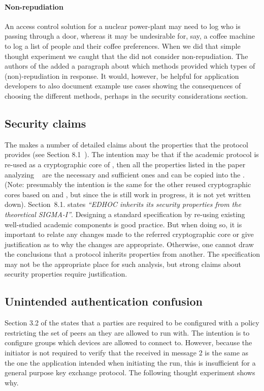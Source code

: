 \documentclass[runningheads,draft,x11names]{llncs}
\begin{document}
\paragraph{Non-repudiation}
An access control solution for a nuclear power-plant may need to log who is
passing through a door, whereas it may be undesirable for, say, a coffee machine
to log a list of people and their coffee preferences.
%
When we did that simple thought experiment we caught that the \mSpec{} did not
consider non-repudiation.
%
The authors of the \mSpec{} added a paragraph about which methods provided which
types of (non)-repudiation in response.
%
It would, however, be helpful for application developers to also document
example use cases showing the consequences of choosing the different methods,
perhaps in the security considerations section.

\subsection{Security claims}
\label{sec:securityClaims}
The \mSpec{} makes a number of detailed claims about the properties that
the protocol provides (see Section 8.1~\cite{selander-lake-edhoc-01}).
%
The intention may be that if the academic protocol \mSigma{} is re-used as a
cryptographic core of \mEdhoc, then all the properties listed
in the paper analyzing \mSigma~\cite{DBLP:conf/crypto/CanettiK02} are the
necessary and sufficient ones and can be copied into the \mSpec.
%
(Note: presumably the intention is the same for the other reused cryptographic
cores based on \mOptls{} and \mNoise{}, but since the \mSpec{} is still work in
progress, it is not yet written down).
%
Section~8.1. states \emph{``EDHOC inherits its security properties
from the theoretical SIGMA-I''}.
%
Designing a standard specification by re-using existing well-studied academic
components is good practice.
%
But when doing so, it is important to relate any changes made to the referred
cryptographic core or give justification as to why the changes are appropriate.
%
Otherwise, one cannot draw the conclusions that a protocol inherits properties
from another.
%
The specification may not be the appropriate place for such analysis, but strong
claims about security properties require justification.
%

\subsection{Unintended authentication confusion}
\label{sec:usableSecurity}
Section 3.2 of the \mSpec{} states that a parties are required to be configured
with a policy restricting the set of peers an they are allowed to run \mEdhoc{}
with.
%
The intention is to configure groups which devices are allowed to connect to.
%
However, because the initiator is not required to verify that the \mIdcredr{}
received in message 2 is the same as the one the application intended when
initiating the \mEdhoc{} run, this is insufficient for a general purpose
key exchange protocol.
%
The following thought experiment shows why.
\end{document}
